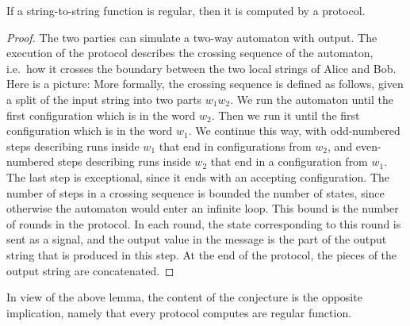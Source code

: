 \begin{lemma}\label{lem:from-regular-to-protocol}
    If a string-to-string function is regular, then it is computed by a protocol.
\end{lemma}
\begin{proof}
    The two parties can simulate a two-way automaton with output. The execution of the protocol describes the crossing sequence of the automaton, i.e.~how it crosses the boundary between the two local strings of Alice and Bob. Here is a picture: 
    More formally, the crossing sequence is defined as follows, given  a split of the input string into two parts $w_1 w_2$. We run the automaton until the first configuration which is in the word $w_2$. Then we run it until the first configuration which is in the word $w_1$. We continue this way, with odd-numbered steps describing runs inside $w_1$ that end in  configurations from $w_2$, and even-numbered steps describing runs inside $w_2$ that end in a configuration from $w_1$. The last step is exceptional, since it ends with an accepting configuration. 
    The number of steps in a crossing sequence is bounded  the number of states, since otherwise the automaton would enter an infinite loop. This bound is the number of rounds in the protocol. In each round, the state corresponding to this round is sent as a signal, and the output value in the message is the  part of the output string that is produced in this  step. At the end of the protocol, the pieces of the output string are concatenated. 
\end{proof}

In view of the above lemma, the content of the conjecture is the opposite implication, namely that every protocol computes are regular function.  

